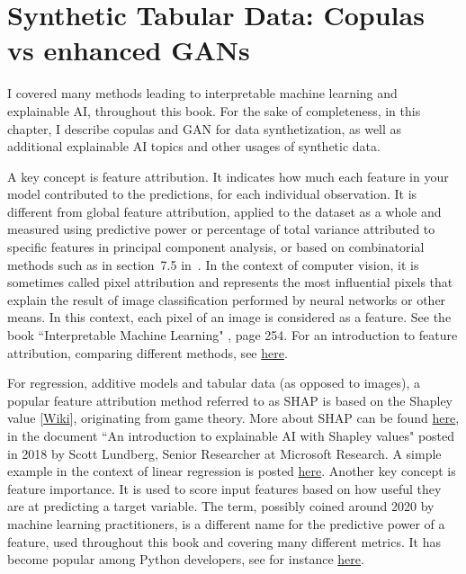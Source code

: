 \documentclass[oneside,10pt]{book}
\begin{document}

\chapter{Synthetic Tabular Data: Copulas vs enhanced GANs}{}\label{newai}

  I covered many methods leading to interpretable machine learning and \textcolor{index}{explainable AI}, throughout this book. For the sake of completeness, in this chapter, I describe copulas and GAN for data synthetization, as well as additional explainable AI topics and other usages of
synthetic data.

A key concept is \textcolor{index}{feature attribution}. It indicates how much each feature in your model contributed to the predictions, for each individual observation. It is different from global feature attribution, applied to the dataset as a whole and measured using \textcolor{index}{predictive power}
  or percentage of total variance attributed to specific features in
\textcolor{index}{principal component analysis}, or based on combinatorial methods such as in  section~7.5 in~\cite{vgelsevier}. In the context of computer vision, it is sometimes called pixel
 attribution and represents the most influential pixels that explain the result of image classification performed by neural networks or other means. In this context, each pixel of an image is considered as a feature. See the book ``Interpretable Machine Learning" \cite{cmol}, page 254. For an introduction to feature attribution, comparing different methods, see
 \href{https://cloud.google.com/ai-platform/prediction/docs/ai-explanations/overview}{here}.

For regression, additive models and tabular data (as opposed to images), a popular feature attribution method referred to as SHAP is based on the
\textcolor{index}{Shapley value} [\href{https://en.wikipedia.org/wiki/Shapley_value}{Wiki}], originating from game theory. More about SHAP can be
 found
\href{https://shap.readthedocs.io/en/latest/example_notebooks/overviews/An\%20introduction\%20to\%20explainable\%20AI\%20with\%20Shapley\%20values.html}{here},
 in the document ``An introduction to explainable AI with Shapley values" posted in 2018 by Scott Lundberg, Senior Researcher at Microsoft Research.
 A simple example in the context of linear regression is posted
\href{https://towardsdatascience.com/explainable-ai-xai-with-shap-regression-problem-b2d63fdca670}{here}. Another key concept is \textcolor{index}{feature importance}. It is used to score input features based on how useful they are at predicting a target variable.
The term, possibly coined around 2020 by machine learning practitioners, is a different name for the
\textcolor{index}{predictive power} of a feature, used throughout this book and covering many different metrics. It has become
 popular among Python developers, see for instance \href{https://machinelearningmastery.com/calculate-feature-importance-with-python/}{here}.
\end{document}

